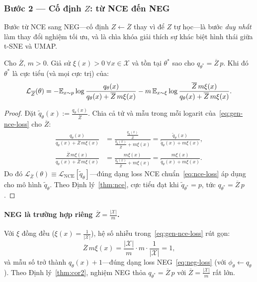\subsubsection{Bước 2 --- Cố định $Z$: từ NCE đến NEG}
\label{sec:nce-to-neg}

Bước từ NCE sang NEG---cố định $Z \leftarrow \overline{Z}$ thay vì để $Z$ tự học---là bước \emph{duy nhất} làm thay đổi nghiệm tối ưu, và là chìa khóa giải thích sự khác biệt hình thái giữa t-SNE và UMAP.

\begin{theorem}
\label{thm:cor2}
Cho $\overline{Z},\, m > 0$. Giả sử $\xi(x) > 0\ \forall x \in \mathcal{X}$ và tồn tại $\theta^*$ sao cho $q_{\theta^*} = \overline{Z}\,p$. Khi đó $\theta^*$ là cực tiểu (và mọi cực trị) của:
\begin{equation}
  \mathcal{L}_{\overline{Z}}(\theta)
  = -\mathbb{E}_{x \sim p}\log\frac{q_\theta(x)}{q_\theta(x) + \overline{Z}\,m\xi(x)}
  - m\,\mathbb{E}_{x \sim \xi}\log\frac{\overline{Z}\,m\xi(x)}{q_\theta(x) + \overline{Z}\,m\xi(x)}.
  \label{eq:gen-nce-loss}
\end{equation}
\end{theorem}

\begin{proof}
Đặt $\tilde{q}_\theta(x) := \frac{q_\theta(x)}{\overline{Z}}$. Chia cả tử và mẫu trong mỗi logarit của~\eqref{eq:gen-nce-loss} cho $\overline{Z}$:
\begin{align*}
  \frac{q_\theta(x)}{q_\theta(x) + \overline{Z}\,m\xi(x)}
  &= \frac{\frac{q_\theta(x)}{\overline{Z}}}{\frac{q_\theta(x)}{\overline{Z}} + m\xi(x)}
  = \frac{\tilde{q}_\theta(x)}{\tilde{q}_\theta(x) + m\xi(x)},\\[4pt]
  \frac{\overline{Z}\,m\xi(x)}{q_\theta(x) + \overline{Z}\,m\xi(x)}
  &= \frac{m\xi(x)}{\frac{q_\theta(x)}{\overline{Z}} + m\xi(x)}
  = \frac{m\xi(x)}{\tilde{q}_\theta(x) + m\xi(x)}.
\end{align*}
Do đó $\mathcal{L}_{\overline{Z}}(\theta) \equiv \mathcal{L}_{\text{NCE}}[\tilde{q}_\theta]$---đúng dạng loss NCE chuẩn~\eqref{eq:nce-loss} áp dụng cho mô hình $\tilde{q}_\theta$. Theo Định lý~\ref{thm:nce}, cực tiểu đạt khi $\tilde{q}_{\theta^*} = p$, tức $q_{\theta^*} = \overline{Z}\,p$.
\end{proof}

\paragraph{NEG là trường hợp riêng $\overline{Z} = \frac{|\mathcal{X}|}{m}$.}
Với $\xi$ đồng đều ($\xi(x) = \frac{1}{|\mathcal{X}|}$), hệ số nhiễu trong~\eqref{eq:gen-nce-loss} rút gọn:
\[
  \overline{Z}\,m\xi(x) = \frac{|\mathcal{X}|}{m}\cdot m \cdot \frac{1}{|\mathcal{X}|} = 1,
\]
và mẫu số trở thành $q_\theta(x) + 1$---đúng dạng loss NEG~\eqref{eq:neg-loss} (với $\phi_\theta \leftarrow q_\theta$). Theo Định lý~\ref{thm:cor2}, nghiệm NEG thỏa $q_{\theta^*} = \overline{Z}\,p$ với $\overline{Z} = \frac{|\mathcal{X}|}{m}$ rất lớn.

